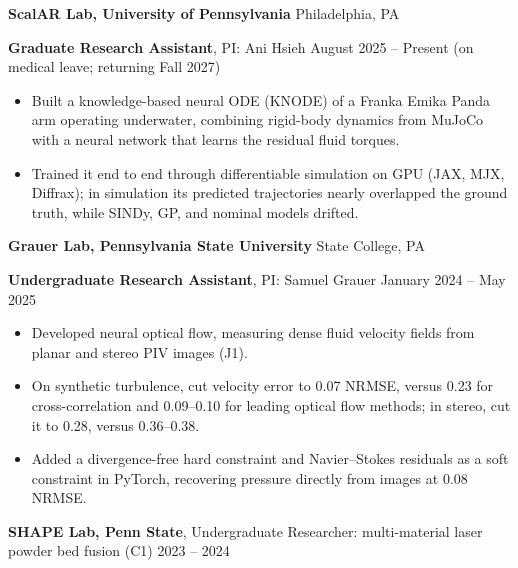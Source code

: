 \textbf{ScalAR Lab, University of Pennsylvania} \hfill Philadelphia, PA

\textbf{Graduate Research Assistant}, PI: Ani Hsieh \hfill August 2025 -- Present (on medical leave; returning Fall 2027)
\begin{itemize}[noitemsep, topsep=0pt, partopsep=0pt, parsep=0pt]
    \item Built a knowledge-based neural ODE (KNODE) of a Franka Emika Panda arm operating underwater, combining rigid-body dynamics from MuJoCo with a neural network that learns the residual fluid torques.

    \item Trained it end to end through differentiable simulation on GPU (JAX, MJX, Diffrax); in simulation its predicted trajectories nearly overlapped the ground truth, while SINDy, GP, and nominal models drifted.
\end{itemize}

\vspace{4pt}

\textbf{Grauer Lab, Pennsylvania State University} \hfill State College, PA

\textbf{Undergraduate Research Assistant}, PI: Samuel Grauer \hfill January 2024 -- May 2025
\begin{itemize}[noitemsep, topsep=0pt, partopsep=0pt, parsep=0pt]
    \item Developed neural optical flow, measuring dense fluid velocity fields from planar and stereo PIV images (J1).

    \item On synthetic turbulence, cut velocity error to 0.07 NRMSE, versus 0.23 for cross-correlation and 0.09--0.10 for leading optical flow methods; in stereo, cut it to 0.28, versus 0.36--0.38.

    \item Added a divergence-free hard constraint and Navier--Stokes residuals as a soft constraint in PyTorch, recovering pressure directly from images at 0.08 NRMSE.
\end{itemize}

\vspace{4pt}

\textbf{SHAPE Lab, Penn State}, Undergraduate Researcher: multi-material laser powder bed fusion (C1) \hfill 2023 -- 2024
